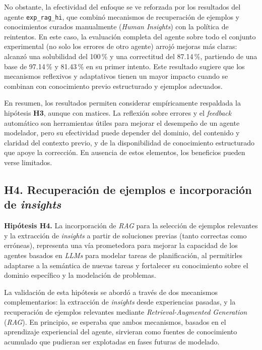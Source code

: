 No obstante, la efectividad del enfoque se ve reforzada por los resultados del agente \texttt{exp\_rag\_hi}, que combinó mecanismos de recuperación de ejemplos y conocimientos curados manualmente (\textit{Human Insights}) con la política de reintentos. En este caso, la evaluación completa del agente sobre todo el conjunto experimental (no solo los errores de otro agente) arrojó mejoras más claras: alcanzó una solubilidad del 100\,\% y una correctitud del 87.14\,\%, partiendo de una base de 97.14\,\% y 81.43\,\% en su primer intento. Este resultado sugiere que los mecanismos reflexivos y adaptativos tienen un mayor impacto cuando se combinan con conocimiento previo estructurado y ejemplos adecuados.

En resumen, los resultados permiten considerar empíricamente respaldada la hipótesis \textbf{H3}, aunque con matices. La reflexión sobre errores y el \textit{feedback} automático son herramientas útiles para mejorar el desempeño de un agente modelador, pero su efectividad puede depender del dominio, del contenido y claridad del contexto previo, y de la disponibilidad de conocimiento estructurado que apoye la corrección. En ausencia de estos elementos, los beneficios pueden verse limitados.

\subsection*{H4. Recuperación de ejemplos e incorporación de \textit{insights}}

\textbf{Hipótesis H4.} La incorporación de \textit{RAG} para la selección de ejemplos relevantes y la extracción de \textit{insights} a partir de soluciones previas (tanto correctas como erróneas), representa una vía prometedora para mejorar la capacidad de los agentes basados en \textit{LLMs} para modelar tareas de planificación, al permitirles adaptarse a la semántica de nuevas tareas y fortalecer su conocimiento sobre el dominio específico y la modelación de problemas.

La validación de esta hipótesis se abordó a través de dos mecanismos complementarios: la extracción de \textit{insights} desde experiencias pasadas, y la recuperación de ejemplos relevantes mediante \textit{Retrieval-Augmented Generation} (\textit{RAG}). En principio, se esperaba que ambos mecanismos, basados en el aprendizaje experiencial del agente, sirvieran como fuentes de conocimiento acumulado que pudieran ser explotadas en fases futuras de modelado.

